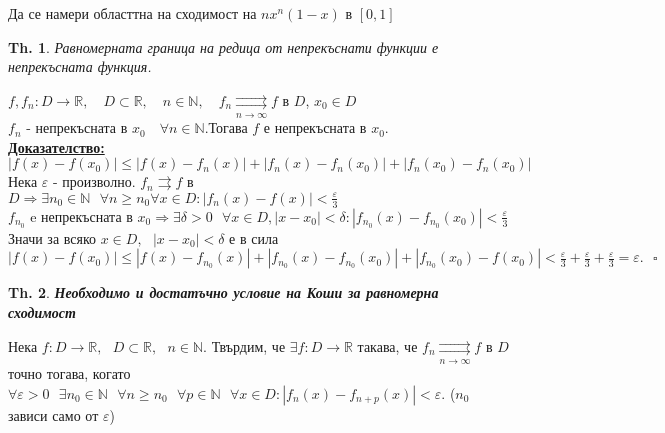 \documentclass[12pt]{article}
\newcommand{\halfbox}[1]{\rbbox{#1}\quad}
\newtheorem{theorem}{Th.}
\newcommand{\spc}{\text{ }}
\begin{document}
	\halfbox{Задача} Да се намери областтна на сходимост на $nx^n(1-x)$ в $[0,1]$\\
	
	\begin{theorem}
		Равномерната граница на редица от непрекъснати функции е непрекъсната функция.
	\end{theorem}
	$f, f_n : D \rightarrow \mathbb{R}, \quad D\subset\mathbb{R}, \quad n\in\mathbb{N},\quad f_n \underset{n\to\infty}{\rightrightarrows}f$ в $D$, $x_0 \in D$\\
	$f_n$ - непрекъсната в $x_0 \quad \forall n \in \mathbb{N}$.\quad Тогава $f$ е непрекъсната в $x_0$.\\
	
	\textbf{\underline{Доказателство:}}
	$|f(x) - f(x_0)| \leq |f(x)-f_n(x)| + |f_n(x)-f_n(x_0)| + |f_n(x_0) - f_n(x_0)|$\\
	Нека $\varepsilon$ - произволно. $f_n \rightrightarrows f$ в $D \Rightarrow \boxed{\exists n_0 \in \mathbb{N}}\spc \forall n \geq n_0 \forall x \in D : |f_n(x) - f(x)| < \frac{\varepsilon}{3}$\\
	$f_{n_0}\text{ e непрекъсната в }x_0 \Rightarrow \boxed{\exists\delta>0}\spc\forall x\in D, |x - x_0| < \delta : |f_{n_0}(x) - f_{n_0}(x_0)| < \frac{\varepsilon}{3}$ \\
	Значи за всяко $x\in D, \spc|x - x_0|<\delta$ е в сила $|f(x) - f(x_0)| \leq |f(x) - f_{n_0}(x)| + |f_{n_0}(x) - f_{n_{0}}(x_0)| + |f_{n_0}(x_0) - f(x_0)| < \frac{\varepsilon}{3} + \frac{\varepsilon}{3} + \frac{\varepsilon}{3} = \varepsilon.\spc \square$\\
	
	\begin{theorem}
		\textbf{Необходимо и достатъчно условие на Коши за равномерна сходимост}
	\end{theorem}
	Нека $f: D \rightarrow \mathbb{R},\spc D\subset\mathbb{R},\spc n\in\mathbb{N}$. Твърдим, че $\exists f:D\rightarrow\mathbb{R}$ такава, че $f_n\underset{n\to\infty}{\rightrightarrows}f$ в $D$ точно тогава, когато $\forall \varepsilon > 0 \spc\exists n_0 \in \mathbb{N} \spc\forall n \geq n_0 \spc\forall p \in \mathbb{N} \spc\forall x \in D : |f_n(x) - f_{n + p}(x)| < \varepsilon$. ($n_0$ зависи само от $\varepsilon$)\\
	
\end{document}
